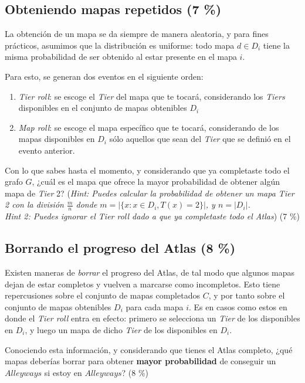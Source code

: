 \documentclass{article}
\begin{document}
\subsection{Obteniendo mapas repetidos (7 \%)}

La obtención de un mapa se da siempre de manera aleatoria, y para fines prácticos, asumimos que la distribución es uniforme: todo mapa $d \in D_i$ tiene la misma probabilidad de ser obtenido al estar presente en el mapa $i$.

Para esto, se generan dos eventos en el siguiente orden:

\begin{enumerate}
    \item \textit{Tier roll}: se escoge el \textit{Tier} del mapa que te tocará, considerando los \textit{Tiers} disponibles en el conjunto de mapas obtenibles $D_i$
    \item \textit{Map roll}: se escoge el mapa específico que te tocará, considerando de los mapas disponibles en $D_i$ sólo aquellos que sean del \textit{Tier} que se definió en el evento anterior.
\end{enumerate}

Con lo que sabes hasta el momento, y considerando que ya completaste todo el grafo $G$, ¿cuál es el mapa que ofrece la mayor probabilidad de obtener algún mapa de \textit{Tier} 2? (\textit{Hint: Puedes calcular la probabilidad de obtener un mapa Tier 2 con la división $\frac{m}{n}$ donde $m = |\{x : x \in D_i, T(x) = 2\}|$, y $n = |D_i|$.
\\ Hint 2: Puedes ignorar el Tier roll dado a que ya completaste todo el Atlas}) (7 \%)

\subsection{Borrando el progreso del Atlas (8 \%)}

Existen maneras de \textit{borrar} el progreso del Atlas, de tal modo que algunos mapas dejan de estar completos y vuelven a marcarse como incompletos. Esto tiene repercusiones sobre el conjunto de mapas completados $C$, y por tanto sobre el conjunto de mapas obtenibles $D_i$ para cada mapa $i$.
Es en casos como estos en donde el \textit{Tier roll} entra en efecto: primero se selecciona un \textit{Tier} de los disponibles en $D_i$, y luego un mapa de dicho \textit{Tier} de los disponibles en $D_i$.

Conociendo esta información, y considerando que tienes el Atlas completo, ¿qué mapas deberías borrar para obtener \textbf{mayor probabilidad} de conseguir un $Alleyways$ si estoy en $Alleyways$? (8 \%)
\end{document}
